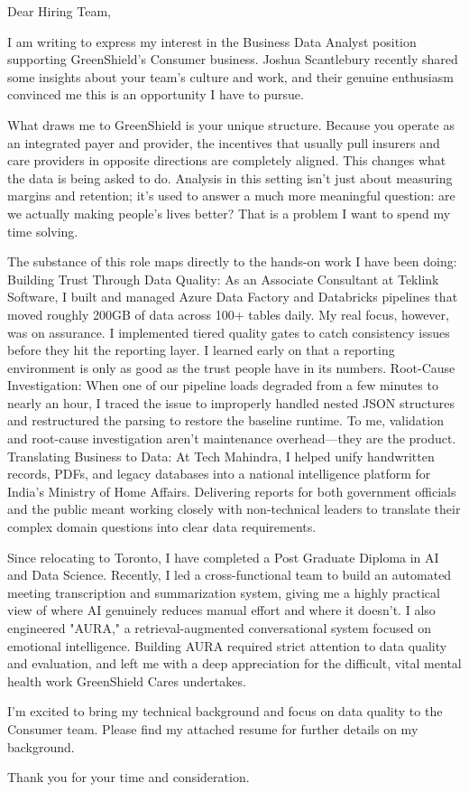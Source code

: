 Dear Hiring Team,

I am writing to express my interest in the Business Data Analyst position supporting GreenShield's Consumer business. Joshua Scantlebury recently shared some insights about your team's culture and work, and their genuine enthusiasm convinced me this is an opportunity I have to pursue.

What draws me to GreenShield is your unique structure. Because you operate as an integrated payer and provider, the incentives that usually pull insurers and care providers in opposite directions are completely aligned. This changes what the data is being asked to do. Analysis in this setting isn't just about measuring margins and retention; it’s used to answer a much more meaningful question: are we actually making people's lives better? That is a problem I want to spend my time solving.

The substance of this role maps directly to the hands-on work I have been doing: Building Trust Through Data Quality: As an Associate Consultant at Teklink Software, I built and managed Azure Data Factory and Databricks pipelines that moved roughly 200GB of data across 100+ tables daily. My real focus, however, was on assurance. I implemented tiered quality gates to catch consistency issues before they hit the reporting layer. I learned early on that a reporting environment is only as good as the trust people have in its numbers.  Root-Cause Investigation: When one of our pipeline loads degraded from a few minutes to nearly an hour, I traced the issue to improperly handled nested JSON structures and restructured the parsing to restore the baseline runtime. To me, validation and root-cause investigation aren't maintenance overhead—they are the product.  Translating Business to Data: At Tech Mahindra, I helped unify handwritten records, PDFs, and legacy databases into a national intelligence platform for India's Ministry of Home Affairs. Delivering reports for both government officials and the public meant working closely with non-technical leaders to translate their complex domain questions into clear data requirements.  

Since relocating to Toronto, I have completed a Post Graduate Diploma in AI and Data Science. Recently, I led a cross-functional team to build an automated meeting transcription and summarization system, giving me a highly practical view of where AI genuinely reduces manual effort and where it doesn't. I also engineered "AURA," a retrieval-augmented conversational system focused on emotional intelligence. Building AURA required strict attention to data quality and evaluation, and left me with a deep appreciation for the difficult, vital mental health work GreenShield Cares undertakes.  

I'm excited to bring my technical background and focus on data quality to the Consumer team. Please find my attached resume for further details on my background. 

Thank you for your time and consideration.